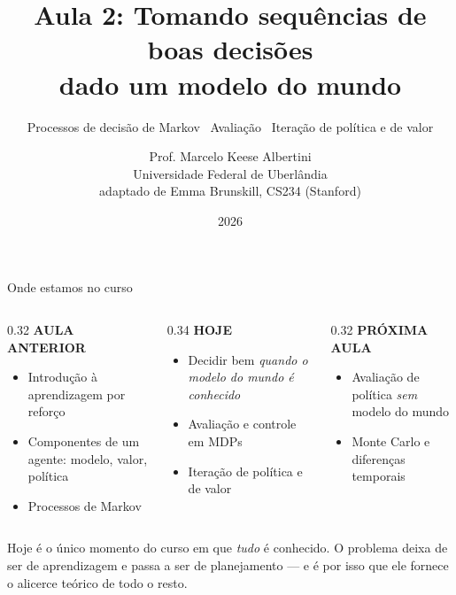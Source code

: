 \documentclass[aspectratio=169, 11pt]{beamer}
\title[Aula 2 — Decisões com modelo]{Aula 2: Tomando sequências de boas decisões\\ dado um modelo do mundo}
\subtitle[Aprendizagem por Reforço]{Processos de decisão de Markov \textbullet\ Avaliação \textbullet\ Iteração de política e de valor}
\author[Marcelo K. Albertini]{Prof. Marcelo Keese Albertini \\
  \footnotesize Universidade Federal de Uberlândia \\
  \footnotesize adaptado de Emma Brunskill, CS234 (Stanford)}
\institute{Aprendizagem por Reforço \textbullet\ UFU}
\date{2026}
\begin{document}
\begin{frame}\titlepage\end{frame}

\begin{frame}{Onde estamos no curso}
  \begin{columns}[T]
    \begin{column}{0.32\textwidth}
      {\color{rlCinza}\small\bfseries AULA ANTERIOR}\\[0.3em]
      \begin{itemize}\setlength{\itemsep}{0.3ex}
        \item Introdução à aprendizagem por reforço
        \item Componentes de um agente: \alert{modelo}, \alert{valor}, \alert{política}
        \item Processos de Markov
      \end{itemize}
    \end{column}
    \begin{column}{0.34\textwidth}
      {\color{rlLaranja}\small\bfseries HOJE}\\[0.3em]
      \begin{itemize}\setlength{\itemsep}{0.3ex}
        \item Decidir bem \emph{quando o modelo do mundo é conhecido}
        \item Avaliação e controle em MDPs
        \item Iteração de política e de valor
      \end{itemize}
    \end{column}
    \begin{column}{0.32\textwidth}
      {\color{rlCinza}\small\bfseries PRÓXIMA AULA}\\[0.3em]
      \begin{itemize}\setlength{\itemsep}{0.3ex}
        \item Avaliação de política \emph{sem} modelo do mundo
        \item Monte Carlo e diferenças temporais
      \end{itemize}
    \end{column}
  \end{columns}
  \vfill
  \begin{ideiabox}
    Hoje é o único momento do curso em que \emph{tudo} é conhecido. O problema deixa de
    ser de aprendizagem e passa a ser de \alert{planejamento} --- e é por isso que ele
    fornece o alicerce teórico de todo o resto.
  \end{ideiabox}
\end{frame}
\end{document}
